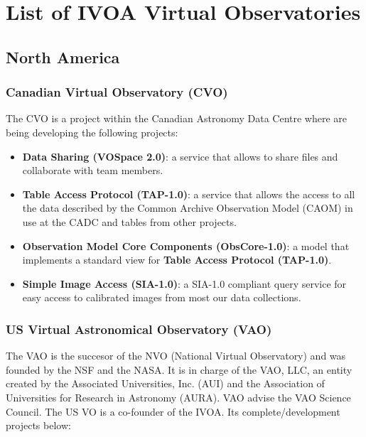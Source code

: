 \section{List of IVOA Virtual Observatories}





\subsection{North America}
\subsubsection{Canadian Virtual Observatory (CVO)}
The CVO \cite{website:cvo-home} \nocite{SchadeDowlerDurand2004} is a project
within the Canadian Astronomy Data Centre where are being developing the
following projects:

\begin{itemize}
\item \textbf{Data Sharing (VOSpace 2.0)}:
a service that allows to share files and collaborate with team members.

\item \textbf{Table Access Protocol (TAP-1.0)}:
a service that allows the access to all the data
described by the Common Archive Observation Model (CAOM) in use at the CADC and
tables from other projects.

\item \textbf{Observation Model Core Components (ObsCore-1.0)}:
a model that implements a standard view for \textbf{Table Access Protocol
                                                    (TAP-1.0)}.

\item \textbf{Simple Image Access (SIA-1.0)}:
a SIA-1.0 compliant query service for easy access to calibrated images from most
our data collections.
\end{itemize}

\subsubsection{US Virtual Astronomical Observatory (VAO)}
The VAO \cite{website:vao-home} \nocite{DeYoung2010} is the succesor of the NVO
(National Virtual Observatory) and was founded by the NSF and the NASA. It is in
charge of the VAO, LLC, an entity created by the Associated Universities, Inc.
(AUI) and the Association of Universities for Research in Astronomy (AURA). VAO
advise the VAO Science Council. The US VO is a co-founder of the IVOA. Its
complete/development projects below:


